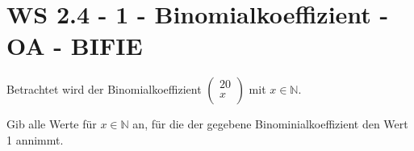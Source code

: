 \section{WS 2.4 - 1 - Binomialkoeffizient - OA - BIFIE}

\begin{beispiel}[WS 2.4]{1}
Betrachtet wird der Binomialkoeffizient $\begin{pmatrix}20 \\
x\\ \end{pmatrix}$ mit $x \in \mathbb{N}.$

Gib alle Werte für $x \in \mathbb{N}$ an, für die der gegebene Binominialkoeffizient den Wert 1 annimmt. 

\end{beispiel}